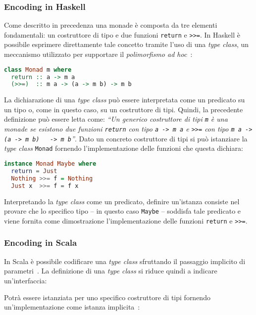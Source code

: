 \subsubsection{Encoding in Haskell}
Come descritto in precedenza una monade è composta da tre elementi fondamentali: un costruttore di tipo e due funzioni \lstinline{return} e \lstinline{>>=}. In Haskell è possibile esprimere direttamente tale concetto tramite l'uso di una \emph{type class}, un meccanismo utilizzato per supportare il \emph{polimorfismo ad hoc}~\cite{cit:type-classes-in-haskell}:
\begin{lstlisting}[language=haskell]
class Monad m where
  return :: a -> m a
  (>>=)  :: m a -> (a -> m b) -> m b
\end{lstlisting}

La dichiarazione di una \emph{type class} può essere interpretata come un predicato su un tipo o, come in questo caso, su un costruttore di tipi.
Quindi, la precedente definizione può essere letta come: \emph{``Un generico costruttore di tipi \lstinline{m} è una monade se esistono due funzioni \lstinline{return} con tipo \lstinline{a -> m a} e \lstinline{>>=} con tipo \lstinline{m a -> (a -> m b)   -> m b}''}.
Dato un concreto costruttore di tipi si può istanziare la \emph{type class} \lstinline{Monad} fornendo l'implementazione delle funzioni che questa dichiara:
\begin{lstlisting}[language=haskell]
instance Monad Maybe where
  return = Just
  Nothing >>= f = Nothing
  Just x  >>= f = f x
\end{lstlisting}

Interpretando la \emph{type class} come un predicato, definire un'istanza consiste nel provare che lo specifico tipo -- in questo caso \lstinline{Maybe} -- soddisfa tale predicato e viene fornita come dimostrazione l'implementazione delle funzioni \lstinline{return} e \lstinline{>>=}.

\subsubsection{Encoding in Scala}
In Scala è possibile codificare una \emph{type class} sfruttando il passaggio implicito di parametri~\cite{cit:type-classes-as-objects-and-implicits}. La definizione di una \emph{type class} si riduce quindi a indicare un'interfaccia:

Potrà essere istanziata per uno specifico costruttore di tipi fornendo un'implementazione come istanza implicita~\cite{cit:scala-book-type-classes}:

